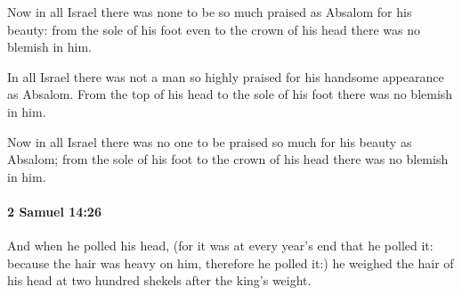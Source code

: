 			\begin{versebox}
					\item[BHS] 
					\item[ASV] Now in all Israel there was none to be so much praised as Absalom for his beauty: from the sole of his foot even to the crown of his head there was no blemish in him.
					\item[NIV] In all Israel there was not a man so highly praised for his handsome appearance as Absalom. From the top of his head to the sole of his foot there was no blemish in him.
					\item[NRSV] Now in all Israel there was no one to be praised so much for his beauty as Absalom; from the sole of his foot to the crown of his head there was no blemish in him.
			\end{versebox}

		\paragraph{2 Samuel 14:26} %
			\label{2SAMUEL-14-26}

			And when he polled his head, (for it was at every year’s end that he polled it: because the hair was heavy on him, therefore he polled it:) he weighed the hair of his head at two hundred shekels after the king’s weight.

